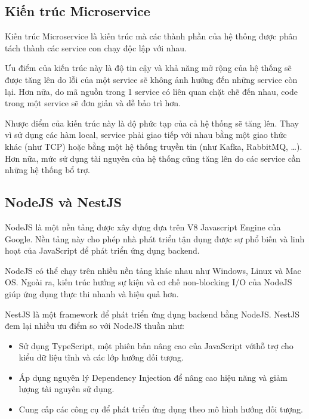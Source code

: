 \documentclass[./../main.tex]{subfiles}
\begin{document}
\hypertarget{kiux1ebfn-truxfac-microservice}{%
\subsection{Kiến trúc
Microservice}\label{kiux1ebfn-truxfac-microservice}}

Kiến trúc Microservice là kiến trúc mà các thành phần của hệ thống được
phân tách thành các service con chạy độc lập với nhau.

Ưu điểm của kiến trúc này là độ tin cậy và khả năng mở rộng của hệ thống
sẽ được tăng lên do lỗi của một service sẽ không ảnh hưởng đến những
service còn lại. Hơn nữa, do mã nguồn trong 1 service có liên quan chặt
chẽ đến nhau, code trong một service sẽ đơn giản và dễ bảo trì hơn.

Nhược điểm của kiến trúc này là độ phức tạp của cả hệ thống sẽ tăng lên.
Thay vì sử dụng các hàm local, service phải giao tiếp với nhau bằng một
giao thức khác (như TCP) hoặc bằng một hệ thống truyền tin (như Kafka,
RabbitMQ, \ldots). Hơn nữa, mức sử dụng tài nguyên của hệ thống cũng
tăng lên do các service cần những hệ thống bổ trợ.

\hypertarget{nodejs-vuxe0-nestjs}{%
\subsection{NodeJS và NestJS}\label{nodejs-vuxe0-nestjs}}

NodeJS là một nền tảng được xây dựng dựa trên V8 Javascript Engine của
Google. Nền tảng này cho phép nhà phát triển tận dụng được sự phổ biến
và linh hoạt của JavaScript để phát triển ứng dụng backend.

NodeJS có thể chạy trên nhiều nền tảng khác nhau như Windows, Linux và
Mac OS. Ngoài ra, kiến trúc hướng sự kiện và cơ chế non-blocking I/O của
NodeJS giúp ứng dụng thực thi nhanh và hiệu quả hơn.

NestJS là một framework để phát triển ứng dụng backend bằng NodeJS.
NestJS đem lại nhiều ưu điểm so với NodeJS thuần như:

\begin{itemize}
\item Sử dụng TypeScript, một phiên bản nâng cao của JavaScript vớihỗ trợ cho kiểu dữ liệu tĩnh và các lớp hướng đối tượng.
\item
  Áp dụng nguyên lý Dependency Injection để nâng cao hiệu năng và giảm
  lượng tài nguyên sử dụng.
\item
  Cung cấp các công cụ để phát triển ứng dụng theo mô hình hướng đối
  tượng.
\end{itemize}
\end{document}
